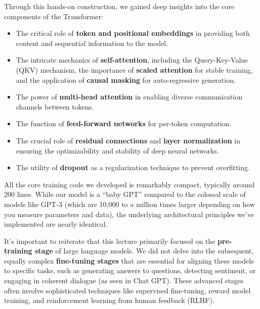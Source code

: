 Through this hands-on construction, we gained deep insights into the core components of the Transformer:
\begin{itemize}
    \item The critical role of \textbf{token and positional embeddings} in providing both content and sequential information to the model.
    \item The intricate mechanics of \textbf{self-attention}, including the Query-Key-Value (QKV) mechanism, the importance of \textbf{scaled attention} for stable training, and the application of \textbf{causal masking} for auto-regressive generation.
    \item The power of \textbf{multi-head attention} in enabling diverse communication channels between tokens.
    \item The function of \textbf{feed-forward networks} for per-token computation.
    \item The crucial role of \textbf{residual connections} and \textbf{layer normalization} in ensuring the optimizability and stability of deep neural networks.
    \item The utility of \textbf{dropout} as a regularization technique to prevent overfitting.
\end{itemize}

All the core training code we developed is remarkably compact, typically around 200 lines. While our model is a ``baby GPT'' compared to the colossal scale of models like GPT-3 (which are 10,000 to a million times larger depending on how you measure parameters and data), the underlying architectural principles we've implemented are nearly identical.

It's important to reiterate that this lecture primarily focused on the \textbf{pre-training stage} of large language models. We did not delve into the subsequent, equally complex \textbf{fine-tuning stages} that are essential for aligning these models to specific tasks, such as generating answers to questions, detecting sentiment, or engaging in coherent dialogue (as seen in Chat GPT). These advanced stages often involve sophisticated techniques like supervised fine-tuning, reward model training, and reinforcement learning from human feedback (RLHF).